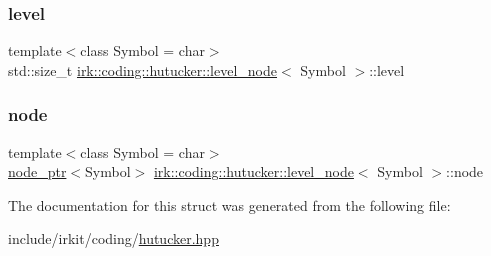 \subsubsection{\texorpdfstring{level}{level}}
{\footnotesize\ttfamily template$<$class Symbol = char$>$ \\
std\+::size\+\_\+t \mbox{\hyperlink{structirk_1_1coding_1_1hutucker_1_1level__node}{irk\+::coding\+::hutucker\+::level\+\_\+node}}$<$ Symbol $>$\+::level}

\mbox{\label{structirk_1_1coding_1_1hutucker_1_1level__node_acaf0bdb35aa0ca18c9c1ce0fda27732b}} 
\subsubsection{\texorpdfstring{node}{node}}
{\footnotesize\ttfamily template$<$class Symbol = char$>$ \\
\mbox{\hyperlink{namespaceirk_1_1coding_1_1hutucker_aa5d22cfdf05ffec38f2531e0307248fe}{node\+\_\+ptr}}$<$Symbol$>$ \mbox{\hyperlink{structirk_1_1coding_1_1hutucker_1_1level__node}{irk\+::coding\+::hutucker\+::level\+\_\+node}}$<$ Symbol $>$\+::node}



The documentation for this struct was generated from the following file\+:\begin{DoxyCompactItemize}
\item 
include/irkit/coding/\mbox{\hyperlink{hutucker_8hpp}{hutucker.\+hpp}}\end{DoxyCompactItemize}
